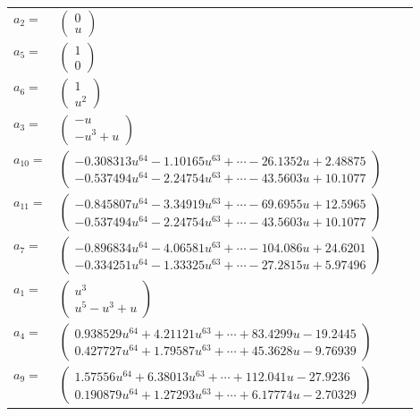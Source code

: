 \documentclass[1p]{elsarticle_modified}
\theoremstyle{definition}
\begin{document}
\begin{tabular}{m{7pt} m{180pt} m{7pt} m{180pt} }
\flushright $a_{2}=$&$\begin{pmatrix}0\\u\end{pmatrix}$ \\
\flushright $a_{5}=$&$\begin{pmatrix}1\\0\end{pmatrix}$ \\
\flushright $a_{6}=$&$\begin{pmatrix}1\\u^2\end{pmatrix}$ \\
\flushright $a_{3}=$&$\begin{pmatrix}- u\\- u^3+u\end{pmatrix}$ \\
\flushright $a_{10}=$&$\begin{pmatrix}-0.308313 u^{64}-1.10165 u^{63}+\cdots-26.1352 u+2.48875\\-0.537494 u^{64}-2.24754 u^{63}+\cdots-43.5603 u+10.1077\end{pmatrix}$ \\
\flushright $a_{11}=$&$\begin{pmatrix}-0.845807 u^{64}-3.34919 u^{63}+\cdots-69.6955 u+12.5965\\-0.537494 u^{64}-2.24754 u^{63}+\cdots-43.5603 u+10.1077\end{pmatrix}$ \\
\flushright $a_{7}=$&$\begin{pmatrix}-0.896834 u^{64}-4.06581 u^{63}+\cdots-104.086 u+24.6201\\-0.334251 u^{64}-1.33325 u^{63}+\cdots-27.2815 u+5.97496\end{pmatrix}$ \\
\flushright $a_{1}=$&$\begin{pmatrix}u^3\\u^5- u^3+u\end{pmatrix}$ \\
\flushright $a_{4}=$&$\begin{pmatrix}0.938529 u^{64}+4.21121 u^{63}+\cdots+83.4299 u-19.2445\\0.427727 u^{64}+1.79587 u^{63}+\cdots+45.3628 u-9.76939\end{pmatrix}$ \\
\flushright $a_{9}=$&$\begin{pmatrix}1.57556 u^{64}+6.38013 u^{63}+\cdots+112.041 u-27.9236\\0.190879 u^{64}+1.27293 u^{63}+\cdots+6.17774 u-2.70329\end{pmatrix}$ \\

\end{tabular}
\end{document}

